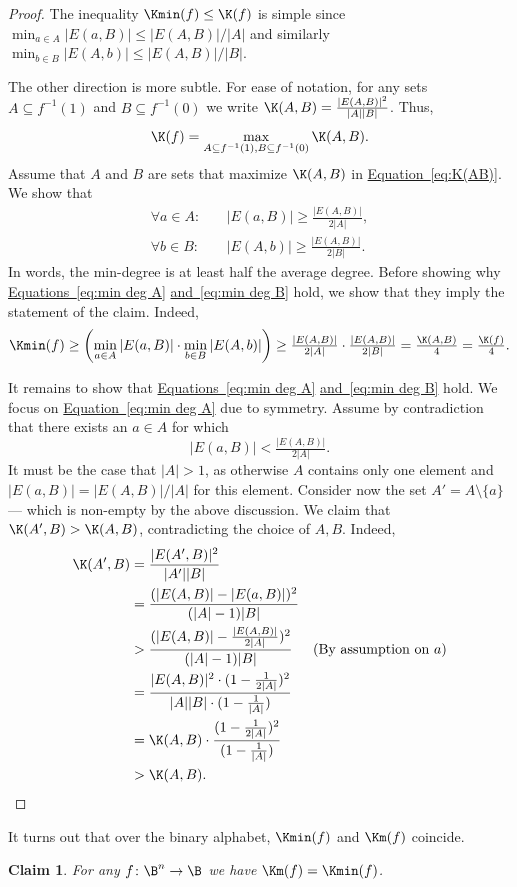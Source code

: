 \documentclass[11pt]{article}
\numberwithin{equation}{section}
\newtheorem{claim}[theorem]{Claim}
\theoremstyle{definition}
\theoremstyle{plain}
\newcommand{\expref}[2]{\hyperref[#2]{#1~\ref{#2}}}
\theoremstyle{definition}\newtheorem{notation}[theorem]{Notation}\theoremstyle{plain}
\begin{document}
\begin{proof}
The inequality $\Kmin(f)\le\K(f)$ is simple since $\min_{a\in A}{|E(a,B)|}\le|E(A,B)|/|A|$
and similarly $\min_{b\in B}{|E(A,b)|}\le|E(A,B)|/|B|$.

The other direction is more subtle. For ease of notation, for any
sets $A\subseteq f^{-1}(1)$ and $B\subseteq f^{-1}(0)$ we 
%
write %
$\K(A,B)=\frac{|E(A,B)|^{2}}{|A||B|}$. Thus, 
\begin{equation}
\K(f)=\max_{A\subseteq f^{-1}(1),B\subseteq f^{-1}(0)}\K(A,B).\label{eq:K(AB)}
\end{equation}
Assume that $A$ and $B$ are sets that maximize $\K(A,B)$ in \expref{Equation}{eq:K(AB)}.
We show that 
\begin{align}
\forall{a\in A}\colon & \quad|E(a,B)|\ge\tfrac{|E(A,B)|}{2|A|},\label{eq:min deg A}\\
\forall{b\in B}\colon & \quad|E(A,b)|\ge\tfrac{|E(A,B)|}{2|B|}.\label{eq:min deg B}
\end{align}
In words, the min-degree is at least half the average degree. Before
showing why \expref{Equations}{eq:min deg A}
\expref{and}{eq:min deg B} hold, we show that they
imply the statement of the claim. Indeed, 
\[
\Kmin(f)\ge\left(\min_{a\in A}{|E(a,B)|}\cdot\min_{b\in B}{|E(A,b)|}\right)\ge\tfrac{|E(A,B)|}{2|A|}\cdot\tfrac{|E(A,B)|}{2|B|}=\tfrac{\K(A,B)}{4}=\tfrac{\K(f)}{4}.
\]

It remains to show that \expref{Equations}{eq:min deg A}
\expref{and}{eq:min deg B} hold. We
focus on \expref{Equation}{eq:min deg A} due to symmetry. Assume by contradiction
that there exists an $a\in A$ for which 
\[
|E(a,B)|<\tfrac{|E(A,B)|}{2|A|}.
\]
It must be the case that $|A|>1$, as otherwise $A$ contains only
one element and $|E(a,B)|=|E(A,B)|/|A|$ for this element. Consider
now the set $A'=A\setminus\{a\}$ --- which is non-empty by the above
discussion. We claim that $\K(A',B)>\K(A,B)$, contradicting the choice
of $A,B$. Indeed, 
\begin{align*}
\K(A',B) & =\frac{|E(A',B)|^{2}}{|A'||B|}\\
 & =\frac{(|E(A,B)|-|E(a,B)|)^{2}}{(|A|-1)|B|}\\
 & >\frac{(|E(A,B)|-\frac{|E(A,B)|}{2|A|})^{2}}{(|A|-1)|B|} & \text{(By assumption on \ensuremath{a})}\\
 & =\frac{|E(A,B)|^{2}\cdot(1-\frac{1}{2|A|})^{2}}{|A||B|\cdot(1-\frac{1}{|A|})}\\
 & =\K(A,B)\cdot\frac{(1-\frac{1}{2|A|})^{2}}{(1-\frac{1}{|A|})}\\
 & >\K(A,B). & \qedhere
\end{align*}
\end{proof}
It turns out that over the binary alphabet, $\Kmin(f)$ and $\Km(f)$
coincide. 
\begin{claim}
\label{claim:Km-Kmin} For any $f\colon\B^{n}\to\B$ we have $\Km(f)=\Kmin(f)$. 
\end{claim}
\end{document}
